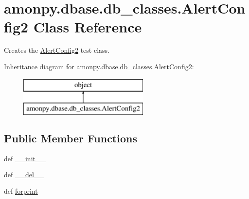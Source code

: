 \hypertarget{classamonpy_1_1dbase_1_1db__classes_1_1_alert_config2}{\section{amonpy.\-dbase.\-db\-\_\-classes.\-Alert\-Config2 Class Reference}
\label{classamonpy_1_1dbase_1_1db__classes_1_1_alert_config2}
}


Creates the \hyperlink{classamonpy_1_1dbase_1_1db__classes_1_1_alert_config2}{Alert\-Config2} test class.  


Inheritance diagram for amonpy.\-dbase.\-db\-\_\-classes.\-Alert\-Config2\-:\begin{figure}[H]
\begin{center}
\leavevmode
\includegraphics[height=2.000000cm]{df/d56/classamonpy_1_1dbase_1_1db__classes_1_1_alert_config2}
\end{center}
\end{figure}
\subsection*{Public Member Functions}
\begin{DoxyCompactItemize}
\item 
def \hyperlink{classamonpy_1_1dbase_1_1db__classes_1_1_alert_config2_af8f26a222e6993c3641895b85501a7dc}{\-\_\-\-\_\-init\-\_\-\-\_\-}
\item 
def \hyperlink{classamonpy_1_1dbase_1_1db__classes_1_1_alert_config2_ac28bc62a993c42b0e909f7cf7fdb6c50}{\-\_\-\-\_\-del\-\_\-\-\_\-}
\item 
def \hyperlink{classamonpy_1_1dbase_1_1db__classes_1_1_alert_config2_ae52dafae228b81cf695bcde9ddb724be}{forprint}
\end{DoxyCompactItemize}
